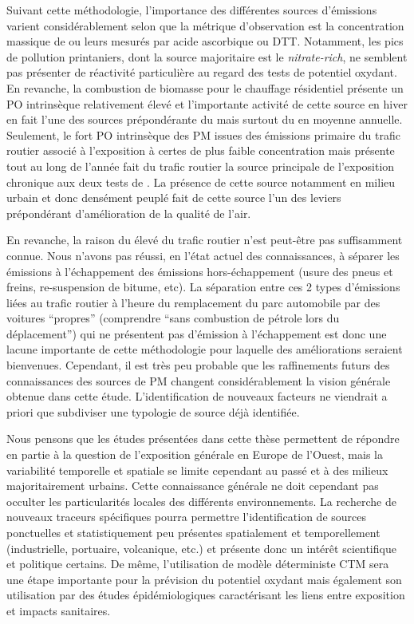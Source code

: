 Suivant cette méthodologie, l'importance des différentes sources d'émissions varient
considérablement selon que la métrique d'observation est la concentration massique de
\PMdix{} ou leurs \POv{} mesurés par acide ascorbique ou DTT. Notamment, les pics de
pollution printaniers, dont la source majoritaire est le \textit{nitrate-rich}, ne
semblent
pas présenter de réactivité particulière au regard des tests de potentiel oxydant. En
revanche, la combustion de biomasse pour le chauffage résidentiel présente un PO
intrinsèque relativement élevé et l'importante activité de cette source en hiver en fait l'une des
sources prépondérante du \PODTTv{} mais surtout du \POAAv{} en moyenne annuelle.  Seulement,
le fort PO intrinsèque des PM issues des émissions primaire du trafic routier associé à
l'exposition à certes de plus faible concentration mais présente tout au long de l'année
fait du trafic routier la source principale de l'exposition chronique aux deux tests de
\POv.  La présence de cette source notamment en milieu urbain et donc densément
peuplé fait de cette source l'un des leviers prépondérant d'amélioration de la qualité de
l'air.

En revanche, la raison du \POv{} élevé du trafic routier n'est peut-être pas suffisamment
connue.
Nous n'avons pas réussi, en l'état actuel des connaissances, à séparer les émissions à
l'échappement des émissions hors-échappement (usure des pneus et freins, re-suspension de
bitume, etc). 
La séparation entre ces 2 types d'émissions liées au trafic routier à l'heure du
remplacement du parc automobile par des voitures ``propres'' (comprendre ``sans combustion
de pétrole lors du déplacement'') qui ne présentent pas d'émission à l'échappement 
est donc une lacune importante de cette méthodologie pour laquelle des améliorations
seraient bienvenues.
Cependant, il est très peu probable que les raffinements futurs des connaissances des sources de
PM changent considérablement la vision générale obtenue dans cette étude. L'identification de nouveaux
facteurs ne viendrait a priori que subdiviser une typologie de source déjà identifiée.

Nous pensons que les études présentées dans cette thèse permettent de répondre en partie à
la question de l'exposition générale en Europe de l'Ouest, mais la variabilité temporelle
et spatiale se limite cependant au passé et  à des milieux majoritairement urbains.
Cette connaissance générale ne doit cependant pas occulter les particularités locales des
différents environnements.
La recherche de nouveaux traceurs spécifiques pourra permettre l'identification de sources
ponctuelles et statistiquement peu présentes spatialement et temporellement
(industrielle, portuaire, volcanique, etc.) et présente donc un intérêt scientifique et
politique certains.
De même, l'utilisation de modèle déterministe CTM sera une étape importante pour la
prévision du potentiel oxydant mais également son utilisation par des études
épidémiologiques caractérisant les liens entre exposition et impacts sanitaires.

